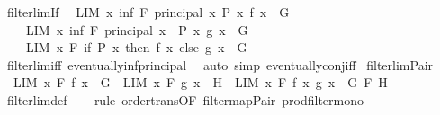 \begin{isabellebody}
%
\isadelimproof
\isanewline
%
\endisadelimproof
\isanewline
{}\isamarkupfalse%
\ filterlim{\isacharunderscore}{\kern0pt}If{\isacharcolon}{\kern0pt}\isanewline
\ \ {\isachardoublequoteopen}LIM\ x\ inf\ F\ {\isacharparenleft}{\kern0pt}principal\ {\isacharbraceleft}{\kern0pt}x{\isachardot}{\kern0pt}\ P\ x{\isacharbraceright}{\kern0pt}{\isacharparenright}{\kern0pt}{\isachardot}{\kern0pt}\ f\ x\ {\isacharcolon}{\kern0pt}{\isachargreater}{\kern0pt}\ G\ {\isasymLongrightarrow}\isanewline
\ \ \ \ LIM\ x\ inf\ F\ {\isacharparenleft}{\kern0pt}principal\ {\isacharbraceleft}{\kern0pt}x{\isachardot}{\kern0pt}\ {\isasymnot}\ P\ x{\isacharbraceright}{\kern0pt}{\isacharparenright}{\kern0pt}{\isachardot}{\kern0pt}\ g\ x\ {\isacharcolon}{\kern0pt}{\isachargreater}{\kern0pt}\ G\ {\isasymLongrightarrow}\isanewline
\ \ \ \ LIM\ x\ F{\isachardot}{\kern0pt}\ if\ P\ x\ then\ f\ x\ else\ g\ x\ {\isacharcolon}{\kern0pt}{\isachargreater}{\kern0pt}\ G{\isachardoublequoteclose}\isanewline
%
\isadelimproof
\ \ %
\endisadelimproof
%
\isatagproof
{}\isamarkupfalse%
\ filterlim{\isacharunderscore}{\kern0pt}iff\ eventually{\isacharunderscore}{\kern0pt}inf{\isacharunderscore}{\kern0pt}principal\ \isamarkupfalse%
\ {\isacharparenleft}{\kern0pt}auto\ simp{\isacharcolon}{\kern0pt}\ eventually{\isacharunderscore}{\kern0pt}conj{\isacharunderscore}{\kern0pt}iff{\isacharparenright}{\kern0pt}%
\endisatagproof
{\isafoldproof}%
%
\isadelimproof
\isanewline
%
\endisadelimproof
\isanewline
{}\isamarkupfalse%
\ filterlim{\isacharunderscore}{\kern0pt}Pair{\isacharcolon}{\kern0pt}\isanewline
\ \ {\isachardoublequoteopen}LIM\ x\ F{\isachardot}{\kern0pt}\ f\ x\ {\isacharcolon}{\kern0pt}{\isachargreater}{\kern0pt}\ G\ {\isasymLongrightarrow}\ LIM\ x\ F{\isachardot}{\kern0pt}\ g\ x\ {\isacharcolon}{\kern0pt}{\isachargreater}{\kern0pt}\ H\ {\isasymLongrightarrow}\ LIM\ x\ F{\isachardot}{\kern0pt}\ {\isacharparenleft}{\kern0pt}f\ x{\isacharcomma}{\kern0pt}\ g\ x{\isacharparenright}{\kern0pt}\ {\isacharcolon}{\kern0pt}{\isachargreater}{\kern0pt}\ G\ {\isasymtimes}\isactrlsub F\ H{\isachardoublequoteclose}\isanewline
%
\isadelimproof
\ \ %
\endisadelimproof
%
\isatagproof
{}\isamarkupfalse%
\ filterlim{\isacharunderscore}{\kern0pt}def\isanewline
\ \ \isamarkupfalse%
\ {\isacharparenleft}{\kern0pt}rule\ order{\isacharunderscore}{\kern0pt}trans{\isacharbrackleft}{\kern0pt}OF\ filtermap{\isacharunderscore}{\kern0pt}Pair\ prod{\isacharunderscore}{\kern0pt}filter{\isacharunderscore}{\kern0pt}mono{\isacharbrackright}{\kern0pt}{\isacharparenright}{\kern0pt}%

\end{isabellebody}

